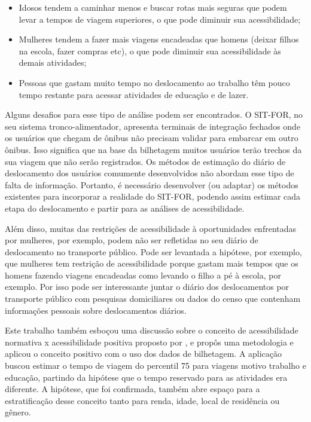 \documentclass[        
    a4paper,          %
    12pt,             %
    chapter=TITLE,    %
    section=Title,    %
    subsection=Title, %
    oneside,          %
    english,          %
    spanish,          %
    brazil,           %
    fleqn             %
]{abntex2}
\begin{document}
  \begin{itemize}
  \tightlist
  \item
    Idosos tendem a caminhar menos e buscar rotas mais seguras que podem levar a tempos de viagem superiores, o que pode diminuir sua acessibilidade;
  \item
    Mulheres tendem a fazer mais viagens encadeadas que homens (deixar filhos na escola, fazer compras etc), o que pode diminuir sua acessibilidade às demais atividades;
  \item
    Pessoas que gastam muito tempo no deslocamento ao trabalho têm pouco tempo restante para acessar atividades de educação e de lazer.
  \end{itemize}
  
  Alguns desafios para esse tipo de análise podem ser encontrados. O SIT-FOR, no seu sistema tronco-alimentador, apresenta terminais de integração fechados onde os usuários que chegam de ônibus não precisam validar para embarcar em outro ônibus. Isso significa que na base da bilhetagem muitos usuários terão trechos da sua viagem que não serão registrados. Os métodos de estimação do diário de deslocamento dos usuários comumente desenvolvidos não abordam esse tipo de falta de informação. Portanto, é necessário desenvolver (ou adaptar) os métodos existentes para incorporar a realidade do SIT-FOR, podendo assim estimar cada etapa do deslocamento e partir para as análises de acessibilidade.
  
  Além disso, muitas das restrições de acessibilidade à oportunidades enfrentadas por mulheres, por exemplo, podem não ser refletidas no seu diário de deslocamento no transporte público. Pode ser levantada a hipótese, por exemplo, que mulheres tem restrição de acessibilidade porque gastam mais tempos que os homens fazendo viagens encadeadas como levando o filho a pé à escola, por exemplo. Por isso pode ser interessante juntar o diário dos deslocamentos por transporte público com pesquisas domiciliares ou dados do censo que contenham informações pessoais sobre deslocamentos diários.
  
  Este trabalho também esboçou uma discussão sobre o conceito de acessibilidade normativa x acessibilidade positiva proposto por \citet{Paez2012}, e propôs uma metodologia e aplicou o conceito positivo com o uso dos dados de bilhetagem. A aplicação buscou estimar o tempo de viagem do percentil 75 para viagens motivo trabalho e educação, partindo da hipótese que o tempo reservado para as atividades era diferente. A hipótese, que foi confirmada, também abre espaço para a estratificação desse conceito tanto para renda, idade, local de residência ou gênero.
  
\end{document}
